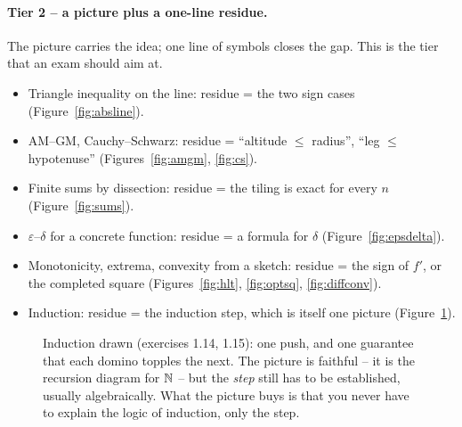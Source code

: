 \paragraph{Tier 2 -- a picture plus a one-line residue.}
The picture carries the idea; one line of symbols closes the gap. This is the tier that
an exam should aim at.
\begin{itemize}\itemsep2pt
\item Triangle inequality on the line: residue = the two sign cases
  (Figure~\ref{fig:absline}).
\item AM--GM, Cauchy--Schwarz: residue = ``altitude $\le$ radius'', ``leg $\le$
  hypotenuse'' (Figures~\ref{fig:amgm}, \ref{fig:cs}).
\item Finite sums by dissection: residue = the tiling is exact for every $n$
  (Figure~\ref{fig:sums}).
\item $\varepsilon$--$\delta$ for a concrete function: residue = a formula for $\delta$
  (Figure~\ref{fig:epsdelta}).
\item Monotonicity, extrema, convexity from a sketch: residue = the sign of $f'$, or the
  completed square (Figures~\ref{fig:hlt}, \ref{fig:optsq}, \ref{fig:diffconv}).
\item Induction: residue = the induction step, which is itself one picture
  (Figure~\ref{fig:dominoes}).
\end{itemize}

\begin{figure}[H]
\centering
{}
\caption{Induction drawn (exercises 1.14, 1.15): one push, and one guarantee that each
domino topples the next. The picture is faithful -- it is the recursion diagram for $\mathbb{N}$
-- but the \emph{step} still has to be established, usually algebraically. What the
picture buys is that you never have to explain the logic of induction, only the step.}
\label{fig:dominoes}
\end{figure}

